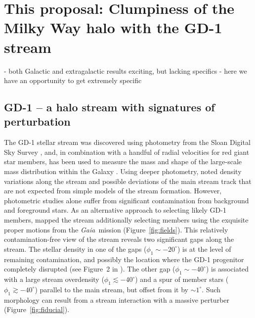 \documentclass[12pt]{article}
\newcommand{\gaia}{\textsl{Gaia}}
\begin{document}
\section*{This proposal: Clumpiness of the Milky Way halo with the GD-1 stream}
- both Galactic and extragalactic results exciting, but lacking specifics
- here we have an opportunity to get extremely specific

\subsection*{GD-1 -- a halo stream with signatures of perturbation}
The GD-1 stellar stream was discovered using photometry from the Sloan Digital Sky Survey \parencite{grillmair2006},
and, in combination with a handful of radial velocities for red giant star members, has been used to measure the mass and shape of the large-scale mass distribution within the Galaxy \parencite{koposov2010, bovy2016}.
Using deeper photometry, \textcite{deboer2018} noted density variations along the stream and possible deviations of the main stream track that are not expected from simple models of the stream formation.
However, photometric studies alone suffer from significant contamination from background and foreground stars.
As an alternative approach to selecting likely GD-1 members, \textcite{pwb2018} mapped the stream additionally selecting members using the exquisite proper motions from the \gaia\ mission (Figure~\ref{fig:fields}).
This relatively contamination-free view of the stream reveals two significant gaps along the stream.
The stellar density in one of the gaps ($\phi_1\sim-20^\circ$) is at the level of remaining contamination, and possibly the location where the GD-1 progenitor completely disrupted (see Figure~2 in \cite{pwb2018}).
The other gap ($\phi_1\sim-40^\circ$) is associated with a large stream overdensity ($\phi_1\lesssim-40^\circ$) and a spur of member stars ($\phi_1\gtrsim-40^\circ$) parallel to the main stream, but offset from it by $\sim1^\circ$.
Such morphology can result from a stream interaction with a massive perturber (Figure~\ref{fig:fiducial}).
\end{document}
